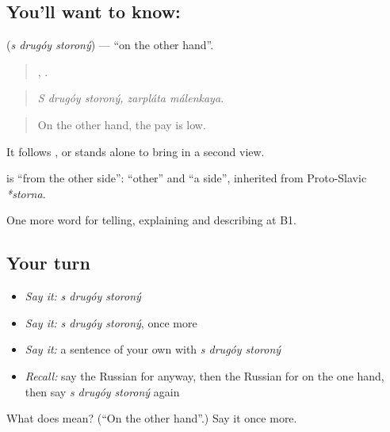 \subsection*{You'll want to know:   }
\textbf{  } (\emph{s drugóy storoný}) — \textquotedblleft{}on the other hand\textquotedblright{}.

\begin{quote}
  ,  .
\end{quote}

\begin{quote}
\emph{S drugóy storoný, zarpláta málenkaya.}
\end{quote}

\begin{quote}
On the other hand, the pay is low.
\end{quote}

It follows \emph{  }, or stands alone to bring in a second view.

\begin{cousinweb}
\textbf{  } is \textquotedblleft{}from the other side\textquotedblright{}: \emph{} \textquotedblleft{}other\textquotedblright{} and \emph{} \textquotedblleft{}a side\textquotedblright{}, inherited from Proto-Slavic \emph{*storna}.
\end{cousinweb}

\begin{grammarlens}[title={What you've built}]
One more word for telling, explaining and describing at B1.
\end{grammarlens}

\subsection*{Your turn}
\begin{itemize}
\raggedright
  \item \emph{Say it:} \emph{s drugóy storoný}
  \item \emph{Say it:} \emph{s drugóy storoný}, once more
  \item \emph{Say it:} a sentence of your own with \emph{s drugóy storoný}
  \item \emph{Recall:} say the Russian for anyway, then the Russian for on the one hand, then say \emph{s drugóy storoný} again
\end{itemize}

\begin{tcolorbox}[breakable,colback=teal!4,colframe=teal!35!black,title={Before you move on}]
What does    mean? (\textquotedblleft{}On the other hand\textquotedblright{}.) Say it once more.
\end{tcolorbox}

